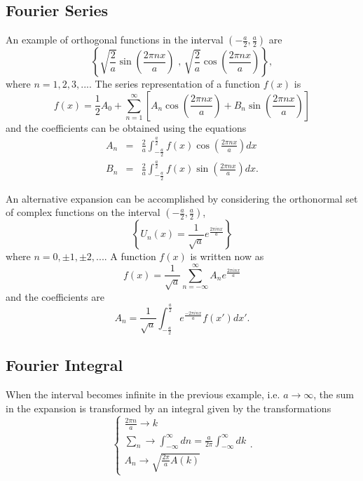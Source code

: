 \subsection{Fourier Series}
An example of orthogonal functions in the interval $\left( - \frac{a}{2}, \frac{a}{2} \right)$ are 
\begin{equation}
\left\lbrace \sqrt{\frac{2}{a}} \sin \left( \frac{2\pi n x}{a} \right) \textrm{ , } \sqrt{\frac{2}{a}} \cos \left( \frac{2\pi n x}{a} \right) \right\rbrace ,
\end{equation}
where $n=1,2,3,...$. The series representation of a function $f(x)$ is
\begin{equation}
 f(x) = \frac{1}{2} A_0 + \sum_{n=1}^\infty \left[ A_n \cos \left( \frac{2\pi n x}{a}  \right) + B_n \sin \left( \frac{2\pi n x}{a}  \right) \right]
 \end{equation} 
and the coefficients can be obtained using the equations
\begin{eqnarray}
A_n &=& \frac{2}{a} \int_{-\frac{a}{2}} ^{\frac{a}{2}} f(x) \cos \left( \frac{2\pi n x}{a}  \right) dx \\
B_n &=& \frac{2}{a} \int_{-\frac{a}{2}} ^{\frac{a}{2}} f(x) \sin \left( \frac{2\pi n x}{a}  \right) dx .
\end{eqnarray}

An alternative expansion can be accomplished  by considering the orthonormal set of complex functions on the interval $\left( - \frac{a}{2}, \frac{a}{2} \right)$,
\begin{equation}
\left\lbrace U_n (x) = \frac{1}{\sqrt{a}} e^{\frac{2\pi i n x}{a}}  \right\rbrace
\end{equation}
where $n=0, \pm 1, \pm 2, ...$. A function $f(x)$ is written now as
\begin{equation}
f(x) = \frac{1}{\sqrt{a}} \sum_{n=-\infty} ^\infty A_n e^{\frac{2\pi i n x}{a}} 
\end{equation}
and the coefficients are
\begin{equation}
A_n = \frac{1}{\sqrt{a}} \int_{-\frac{a}{2}} ^{\frac{a}{2}}  e^{\frac{-2\pi i n x}{a}} f(x') dx'.
\end{equation}

\subsection{Fourier Integral}
When the interval  becomes infinite in the previous example, i.e. $a\rightarrow \infty$, the sum in the expansion is transformed by an integral given by the transformations
\begin{equation}
\begin{cases}
\frac{2\pi n}{a} \rightarrow k \\
\sum_n \rightarrow \int_{-\infty} ^\infty dn = \frac{a}{2\pi}\int_{-\infty} ^{\infty} dk\\
A_n \rightarrow \sqrt{\frac{2\pi}{a} A(k)}
\end{cases} .
\end{equation}

